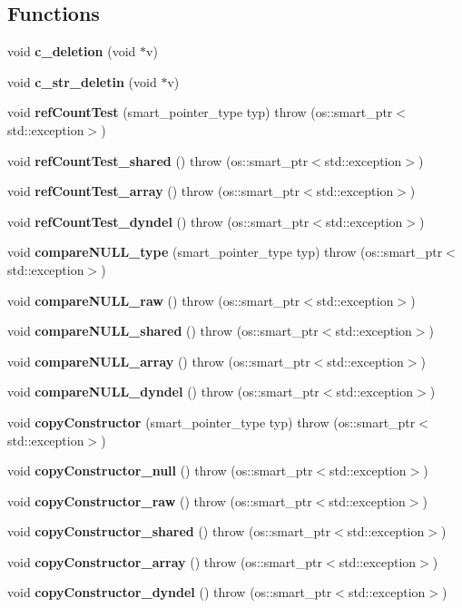 \subsection*{Functions}
\begin{DoxyCompactItemize}
\item 
void {\bf c\+\_\+deletion} (void $\ast$v)
\item 
void {\bf c\+\_\+str\+\_\+deletin} (void $\ast$v)
\item 
void {\bf ref\+Count\+Test} (smart\+\_\+pointer\+\_\+type typ)  throw (os\+::smart\+\_\+ptr$<$std\+::exception$>$)
\item 
void {\bf ref\+Count\+Test\+\_\+shared} ()  throw (os\+::smart\+\_\+ptr$<$std\+::exception$>$)
\item 
void {\bf ref\+Count\+Test\+\_\+array} ()  throw (os\+::smart\+\_\+ptr$<$std\+::exception$>$)
\item 
void {\bf ref\+Count\+Test\+\_\+dyndel} ()  throw (os\+::smart\+\_\+ptr$<$std\+::exception$>$)
\item 
void {\bf compare\+N\+U\+L\+L\+\_\+type} (smart\+\_\+pointer\+\_\+type typ)  throw (os\+::smart\+\_\+ptr$<$std\+::exception$>$)
\item 
void {\bf compare\+N\+U\+L\+L\+\_\+raw} ()  throw (os\+::smart\+\_\+ptr$<$std\+::exception$>$)
\item 
void {\bf compare\+N\+U\+L\+L\+\_\+shared} ()  throw (os\+::smart\+\_\+ptr$<$std\+::exception$>$)
\item 
void {\bf compare\+N\+U\+L\+L\+\_\+array} ()  throw (os\+::smart\+\_\+ptr$<$std\+::exception$>$)
\item 
void {\bf compare\+N\+U\+L\+L\+\_\+dyndel} ()  throw (os\+::smart\+\_\+ptr$<$std\+::exception$>$)
\item 
void {\bf copy\+Constructor} (smart\+\_\+pointer\+\_\+type typ)  throw (os\+::smart\+\_\+ptr$<$std\+::exception$>$)
\item 
void {\bf copy\+Constructor\+\_\+null} ()  throw (os\+::smart\+\_\+ptr$<$std\+::exception$>$)
\item 
void {\bf copy\+Constructor\+\_\+raw} ()  throw (os\+::smart\+\_\+ptr$<$std\+::exception$>$)
\item 
void {\bf copy\+Constructor\+\_\+shared} ()  throw (os\+::smart\+\_\+ptr$<$std\+::exception$>$)
\item 
void {\bf copy\+Constructor\+\_\+array} ()  throw (os\+::smart\+\_\+ptr$<$std\+::exception$>$)
\item 
void {\bf copy\+Constructor\+\_\+dyndel} ()  throw (os\+::smart\+\_\+ptr$<$std\+::exception$>$)

\end{DoxyCompactItemize}
